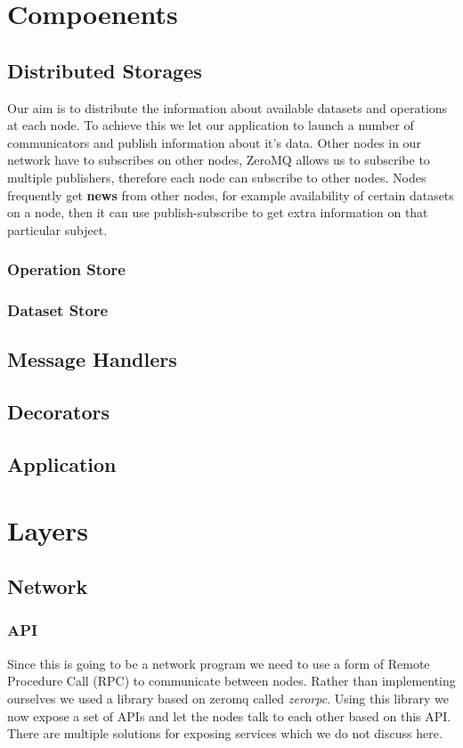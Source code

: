 \section{Compoenents}
\subsection{Distributed Storages}
Our aim is to distribute the information about available datasets and operations at each node. To achieve this
we let our application to launch a number of communicators and publish information about it's data.
Other nodes in our network have to subscribes on other nodes, ZeroMQ allows us to subscribe
to multiple publishers, therefore each node can subscribe to other nodes. Nodes frequently get
\textbf{news} from other nodes, for example availability of certain datasets on a node, then it
can use publish-subscribe to get extra information on that particular subject.
\subsubsection{Operation Store}
\subsubsection{Dataset Store}
\subsection{Message Handlers}
\subsection{Decorators}
\subsection{Application}

\section{Layers}
\subsection{Network}
\subsubsection{API}
Since this is going to be a network program we need to use a form of Remote Procedure Call (RPC) 
to communicate between nodes. Rather than implementing ourselves we used a library based on zeromq 
called \textit{zerorpc}. Using this library we now expose a set of APIs and let the nodes talk to 
each other based on this API. There are multiple solutions for exposing services which we do not discuss here.
